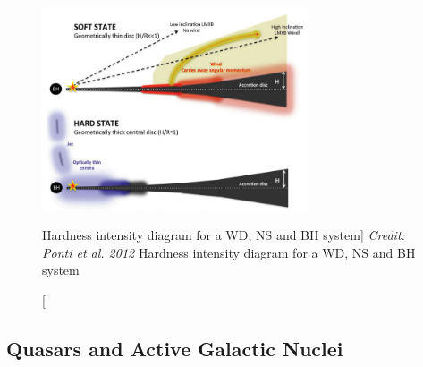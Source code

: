 \begin{figure}
\centering
\includegraphics[width=0.7\textwidth]{figures/01-intro/ponti_wind_cartoon.png}
\caption
[Hardness intensity diagram for a WD, NS and BH system]
{
{\sl Credit: Ponti et al. 2012}
Hardness intensity diagram for a WD, NS and BH system
} 
\label{fig:ponti_cartoon}
\end{figure}

\subsection{Quasars and Active Galactic Nuclei}



